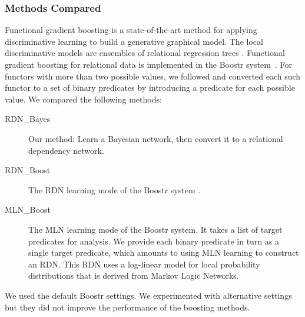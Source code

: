 \documentclass[runningheads,a4paper]{llncs}
\begin{document}
\subsubsection{Methods Compared} Functional gradient boosting is a state-of-the-art method for applying discriminative learning to build a generative graphical model. The local discriminative models are  ensembles of relational regression trees \cite{Khot2011}. Functional gradient boosting for relational data is implemented in the Boostr system~\cite{Khot2013}.
 For functors with more than two possible values, we followed \cite{Khot2011} and converted each such functor to a set of binary predicates by introducing a predicate for each possible value.
%
We compared the following methods:
\begin{description}
\item[RDN\_Bayes] Our method: Learn a Bayesian network, then convert it to a relational dependency network.
\item[RDN\_Boost] The RDN learning mode of the Boostr system \cite{Natarajan2012}. 
\item[MLN\_Boost] The MLN learning mode of the Boostr system. It takes a  list of target predicates for analysis. We provide each binary predicate in turn as a single target predicate, which amounts to using MLN learning to construct an RDN. This RDN uses a log-linear model for local probability distributions that is derived from Markov Logic Networks.
\end{description}
We used the default Boostr settings. We experimented with alternative settings but they did not improve the performance of the boosting methods.

\end{document}
